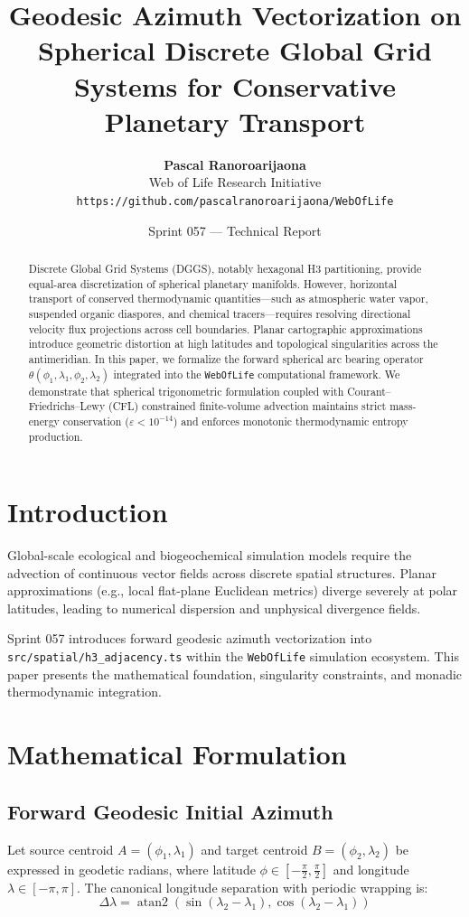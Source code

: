 \documentclass[11pt,a4paper]{article}
\title{\textbf{Geodesic Azimuth Vectorization on Spherical Discrete Global Grid Systems for Conservative Planetary Transport}}
\author{
  \textbf{Pascal Ranoroarijaona} \\
  Web of Life Research Initiative \\
  \texttt{https://github.com/pascalranoroarijaona/WebOfLife}
}
\date{Sprint 057 --- Technical Report}
\begin{document}
\maketitle

\begin{abstract}
Discrete Global Grid Systems (DGGS), notably hexagonal H3 partitioning, provide equal-area discretization of spherical planetary manifolds. However, horizontal transport of conserved thermodynamic quantities---such as atmospheric water vapor, suspended organic diaspores, and chemical tracers---requires resolving directional velocity flux projections across cell boundaries. Planar cartographic approximations introduce geometric distortion at high latitudes and topological singularities across the antimeridian. In this paper, we formalize the forward spherical arc bearing operator $\theta(\phi_1, \lambda_1, \phi_2, \lambda_2)$ integrated into the \texttt{WebOfLife} computational framework. We demonstrate that spherical trigonometric formulation coupled with Courant--Friedrichs--Lewy (CFL) constrained finite-volume advection maintains strict mass-energy conservation ($\varepsilon < 10^{-14}$) and enforces monotonic thermodynamic entropy production.
\end{abstract}

\section{Introduction}
Global-scale ecological and biogeochemical simulation models require the advection of continuous vector fields across discrete spatial structures. Planar approximations (e.g., local flat-plane Euclidean metrics) diverge severely at polar latitudes, leading to numerical dispersion and unphysical divergence fields.

Sprint 057 introduces forward geodesic azimuth vectorization into \texttt{src/spatial/h3\_adjacency.ts} within the \texttt{WebOfLife} simulation ecosystem. This paper presents the mathematical foundation, singularity constraints, and monadic thermodynamic integration.

\section{Mathematical Formulation}

\subsection{Forward Geodesic Initial Azimuth}
Let source centroid $A = (\phi_1, \lambda_1)$ and target centroid $B = (\phi_2, \lambda_2)$ be expressed in geodetic radians, where latitude $\phi \in [-\frac{\pi}{2}, \frac{\pi}{2}]$ and longitude $\lambda \in [-\pi, \pi]$. The canonical longitude separation with periodic wrapping is:
\begin{equation}
\Delta\lambda = \operatorname{atan2}\left(\sin(\lambda_2 - \lambda_1), \cos(\lambda_2 - \lambda_1)\right)
\end{equation}
\end{document}
